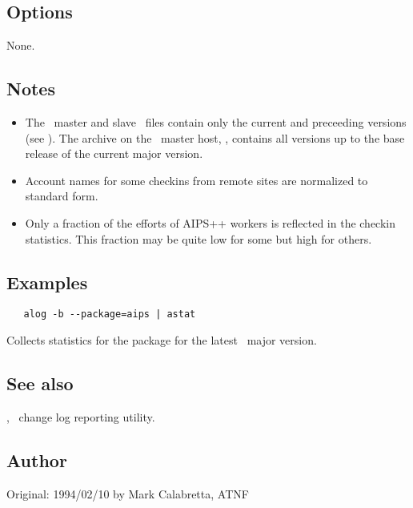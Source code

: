 \subsection*{Options}
 
None.
 
\subsection*{Notes}
 
\begin{itemize}
\item
   The \aipspp\ master and slave \rcs\ files contain only the current and
   preceeding versions (see ).  The archive on the \aipspp\
   master host, ,  contains all versions up to the base
   release of the current major version.

\item
   Account names for some checkins from remote sites are normalized to
   standard form.

\item
   Only a fraction of the efforts of AIPS++ workers is reflected in the
   checkin statistics.  This fraction may be quite low for some but high for
   others.
\end{itemize}

\subsection*{Examples}

\begin{verbatim}
   alog -b --package=aips | astat
\end{verbatim}

\noindent
Collects statistics for the  package for the latest \aipspp\ major
version.
 
\subsection*{See also}
 
, \aipspp\ change log reporting utility.
 
\subsection*{Author}
 
Original: 1994/02/10 by Mark Calabretta, ATNF


